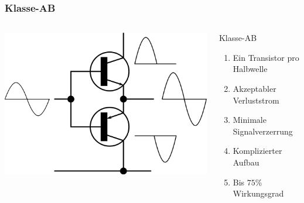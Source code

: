 \begin{frame}
    \frametitle{Klasse-AB}
        \begin{columns}[c]
        \column[c]{4cm}
        \begin{center}
            \includegraphics[width=1\textwidth]{a07/Electronic_Amplifier_Push-pull.png}\\
            \tiny \hyperlink{refs}{\cite{wm}}
    \end{center}
    \column{5cm} \large
    \begin{block}{Klasse-AB}
	    \begin{enumerate} 
			\item Ein Transistor pro Halbwelle
			\item Akzeptabler Verluststrom
			\item Minimale Signalverzerrung
			\item Komplizierter Aufbau
			\item Bis $75\%$ Wirkungsgrad
    	\end{enumerate}
    \end{block}
    \end{columns}
\end{frame}

